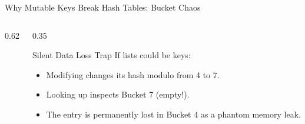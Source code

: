 \begin{frame}{Why Mutable Keys Break Hash Tables: Bucket Chaos}
  \begin{columns}[c,onlytextwidth]
    \begin{column}{0.62\textwidth}
      \centering
    \end{column}
    \begin{column}{0.35\textwidth}
      \begin{WarningBox}{Silent Data Loss Trap}
        \scriptsize
        If lists could be keys:
        \begin{itemize}\setlength{\itemsep}{0.08cm}
          \item Modifying  changes its hash modulo from 4 to 7.
          \item Looking up  inspects Bucket 7 (empty!).
          \item The entry is permanently lost in Bucket 4 as a phantom memory leak.
        \end{itemize}
      \end{WarningBox}
    \end{column}
  \end{columns}
  \vspace{0.15cm}
\end{frame}

